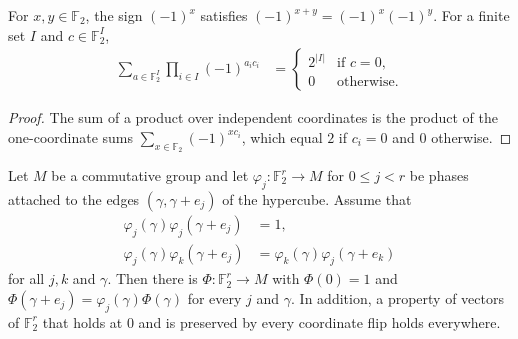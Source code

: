 \begin{lemma}
    \label{thm:monomial_binary_character_sum}
    \leanok
    For $x,y\in\mathbb F_2$, the sign $(-1)^x$ satisfies
    $(-1)^{x+y}=(-1)^x(-1)^y$. For a finite set $I$ and $c\in\mathbb F_2^I$,
    \begin{align}
        \sum_{a\in\mathbb F_2^I}\prod_{i\in I}(-1)^{a_ic_i}
         & =\begin{cases}
                2^{|I|} & \text{if }c=0,    \\
                0       & \text{otherwise}.
            \end{cases}
        \label{eq:monomial_binary_character_sum}
    \end{align}
\end{lemma}

\begin{proof}\leanok
    The sum of a product over independent coordinates is the product of the
    one-coordinate sums $\sum_{x\in\mathbb F_2}(-1)^{xc_i}$, which equal $2$
    if $c_i=0$ and $0$ otherwise.
\end{proof}

\begin{lemma}
    \label{thm:mpug_hypercube_potential}
    \leanok
    Let $M$ be a commutative group and let
    $\varphi_j\colon\mathbb F_2^r\to M$ for $0\leq j<r$ be phases attached
    to the edges $(\gamma,\gamma+e_j)$ of the hypercube. Assume that
    \begin{align}
        \varphi_j(\gamma)\varphi_j(\gamma+e_j)
         & =1,
        \label{eq:mpug_hypercube_involutive}       \\
        \varphi_j(\gamma)\varphi_k(\gamma+e_j)
         & =\varphi_k(\gamma)\varphi_j(\gamma+e_k)
        \label{eq:mpug_hypercube_flat}
    \end{align}
    for all $j,k$ and $\gamma$. Then there is $\Phi\colon\mathbb F_2^r\to M$
    with $\Phi(0)=1$ and $\Phi(\gamma+e_j)=\varphi_j(\gamma)\Phi(\gamma)$ for
    every $j$ and $\gamma$. In addition, a property of vectors of
    $\mathbb F_2^r$ that holds at $0$ and is preserved by every coordinate
    flip holds everywhere.
\end{lemma}

